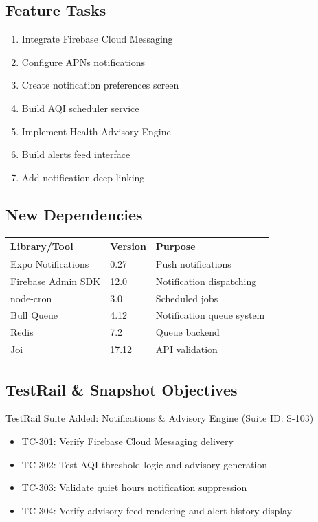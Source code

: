 \documentclass[12pt]{article}
\begin{document}
\subsection{Feature Tasks}

\begin{enumerate}
    \item Integrate Firebase Cloud Messaging
    \item Configure APNs notifications
    \item Create notification preferences screen
    \item Build AQI scheduler service
    \item Implement Health Advisory Engine
    \item Build alerts feed interface
    \item Add notification deep-linking
\end{enumerate}

\subsection{New Dependencies}

\begin{longtable}{|p{5cm}|p{3cm}|p{5cm}|}
\hline
\textbf{Library/Tool} & \textbf{Version} & \textbf{Purpose} \\
\hline
Expo Notifications & 0.27 & Push notifications \\
\hline
Firebase Admin SDK & 12.0 & Notification dispatching \\
\hline
node-cron & 3.0 & Scheduled jobs \\
\hline
Bull Queue & 4.12 & Notification queue system \\
\hline
Redis & 7.2 & Queue backend \\
\hline
Joi & 17.12 & API validation \\
\hline
\end{longtable}

\subsection{TestRail \& Snapshot Objectives}
TestRail Suite Added: Notifications \& Advisory Engine (Suite ID: S-103)
\begin{itemize}
    \item TC-301: Verify Firebase Cloud Messaging delivery
    \item TC-302: Test AQI threshold logic and advisory generation
    \item TC-303: Validate quiet hours notification suppression
    \item TC-304: Verify advisory feed rendering and alert history display
\end{itemize}
\end{document}
